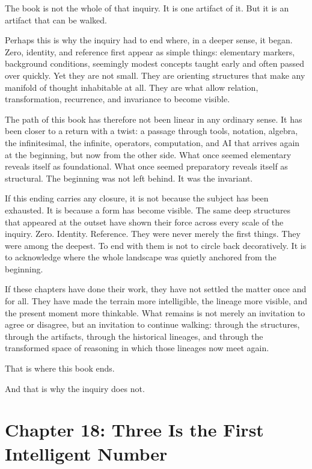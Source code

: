 The book is not the whole of that inquiry. It is one artifact of it. But
it is an artifact that can be walked.

Perhaps this is why the inquiry had to end where, in a deeper sense, it
began. Zero, identity, and reference first appear as simple things:
elementary markers, background conditions, seemingly modest concepts
taught early and often passed over quickly. Yet they are not small. They
are orienting structures that make any manifold of thought inhabitable
at all. They are what allow relation, transformation, recurrence, and
invariance to become visible.

The path of this book has therefore not been linear in any ordinary
sense. It has been closer to a return with a twist: a passage through
tools, notation, algebra, the infinitesimal, the infinite, operators,
computation, and AI that arrives again at the beginning, but now from
the other side. What once seemed elementary reveals itself as
foundational. What once seemed preparatory reveals itself as structural.
The beginning was not left behind. It was the invariant.

If this ending carries any closure, it is not because the subject has
been exhausted. It is because a form has become visible. The same deep
structures that appeared at the outset have shown their force across
every scale of the inquiry. Zero. Identity. Reference. They were never
merely the first things. They were among the deepest. To end with them
is not to circle back decoratively. It is to acknowledge where the whole
landscape was quietly anchored from the beginning.

If these chapters have done their work, they have not settled the matter
once and for all. They have made the terrain more intelligible, the
lineage more visible, and the present moment more thinkable. What
remains is not merely an invitation to agree or disagree, but an
invitation to continue walking: through the structures, through the
artifacts, through the historical lineages, and through the transformed
space of reasoning in which those lineages now meet again.

That is where this book ends.

And that is why the inquiry does not.

\newpage
\vspace*{3cm}

\hypertarget{chapter-18-three-is-the-first-intelligent-number}{%
\section{Chapter 18: Three Is the First Intelligent
Number}\label{chapter-18-three-is-the-first-intelligent-number}}

